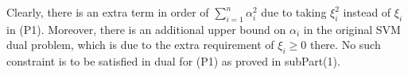\documentclass[a4paper,11pt]{article}
\begin{document}
\begin{mlsolution}
Clearly, there is an extra term in order of $ \sum_{i=1}^n \alpha_i^2$ due to taking $\xi_i^2$ instead of $\xi_i$ in (P1). Moreover, there is an additional upper bound on $\alpha_i$ in the original SVM dual problem, which is due to the extra requirement of $\xi_i \geq 0$ there. No such constraint is to be satisfied in dual for (P1) as proved in subPart(1).


\end{mlsolution}



					
\end{document}
